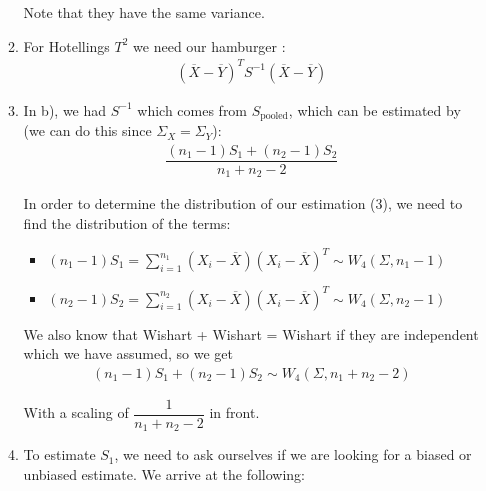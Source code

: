 \begin{enumerate}[label=\arabic*.,leftmargin=*]
\begin{enumerate}[label=\alph*),leftmargin=*]
        \noindent Note that they have the same variance.
        \par\bigskip
      \item For Hotellings $T^2$ we need our hamburger :
        \begin{equation*}
          \begin{gathered}
            (\overline{X}-\overline{Y})^TS^{-1}(\overline{X}-\overline{Y})
          \end{gathered}
        \end{equation*}
        \par\bigskip
      \item In b), we had $S^{-1}$ which comes from $S_{\text{pooled}}$, which can be estimated by (we can do this since $\Sigma_X = \Sigma_Y$):
        \begin{equation}
          \begin{gathered}
            \dfrac{(n_1-1)S_1+(n_2-1)S_2}{n_1+n_2-2}
          \end{gathered}
        \end{equation}
        \par\bigskip
        \noindent In order to determine the distribution of our estimation (3), we need to find the distribution of the terms: \par
        \begin{itemize}
          \item $(n_1-1)S_1 = \sum_{i=1}^{n_1}(X_i-\overline{X})(X_i-\overline{X})^T\sim W_4(\Sigma,n_1-1)$
          \item $(n_2-1)S_2 = \sum_{i=1}^{n_2}(X_i-\overline{X})(X_i-\overline{X})^T\sim W_4(\Sigma,n_2-1)$
        \end{itemize}
        \par\bigskip
        \noindent We also know that Wishart + Wishart = Wishart if they are independent which we have assumed, so we get
        \begin{equation*}
          \begin{gathered}
            (n_1-1)S_1+(n_2-1)S_2\sim W_4(\Sigma,n_1+n_2-2)
          \end{gathered}
        \end{equation*}
        \par\bigskip
        \noindent With a scaling of $\dfrac{1}{n_1+n_2-2}$ in front. 
        \par\bigskip
      \item To estimate $S_1$, we need to ask ourselves if we are looking for a biased or unbiased estimate. We arrive at the following:\par

\end{enumerate}
\end{enumerate}
